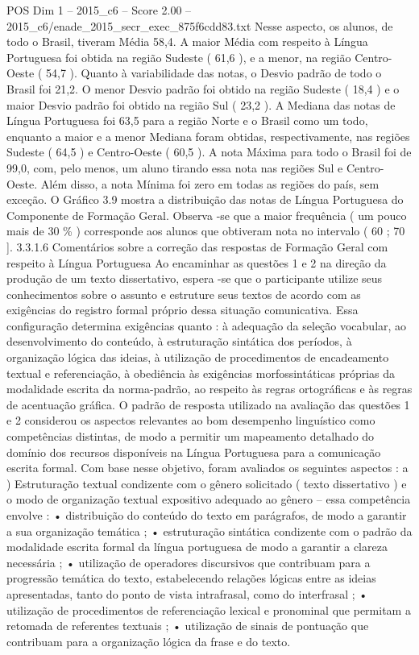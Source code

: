 \begin{textsample}{POS Dim 1 – 2015\_c6 – Score 2.00 – 2015\_c6/enade\_2015\_secr\_exec\_875f6cdd83.txt}
Nesse aspecto, os alunos, de todo o Brasil, tiveram Média 58,4.
A maior Média com respeito à Língua Portuguesa foi obtida na região Sudeste ( 61,6 ), e a menor, na região Centro-Oeste ( 54,7 ).
Quanto à variabilidade das notas, o Desvio padrão de todo o Brasil foi 21,2.
O menor Desvio padrão foi obtido na região Sudeste ( 18,4 ) e o maior Desvio padrão foi obtido na região Sul ( 23,2 ).
A Mediana das notas de Língua Portuguesa foi 63,5 para a região Norte e o Brasil como um todo, enquanto a maior e a menor Mediana foram obtidas, respectivamente, nas regiões Sudeste ( 64,5 ) e Centro-Oeste ( 60,5 ).
A nota Máxima para todo o Brasil foi de 99,0, com, pelo menos, um aluno tirando essa nota nas regiões Sul e Centro-Oeste.
Além disso, a nota Mínima foi zero em todas as regiões do país, sem exceção.
O Gráfico 3.9 mostra a distribuição das notas de Língua Portuguesa do Componente de Formação Geral.
Observa -se que a maior frequência ( um pouco mais de 30 \% ) corresponde aos alunos que obtiveram nota no intervalo ( 60 ; 70 ]. 3.3.1.6 Comentários sobre a correção das respostas de Formação Geral com respeito à Língua Portuguesa Ao encaminhar as questões 1 e 2 na direção da produção de um texto dissertativo, espera -se que o participante utilize seus conhecimentos sobre o assunto e estruture seus textos de acordo com as exigências do registro formal próprio dessa situação comunicativa.
Essa configuração determina exigências quanto : à adequação da seleção vocabular, ao desenvolvimento do conteúdo, à estruturação sintática dos períodos, à organização lógica das ideias, à utilização de procedimentos de encadeamento textual e referenciação, à obediência às exigências morfossintáticas próprias da modalidade escrita da norma-padrão, ao respeito às regras ortográficas e às regras de acentuação gráfica.
O padrão de resposta utilizado na avaliação das questões 1 e 2 considerou os aspectos relevantes ao bom desempenho linguístico como competências distintas, de modo a permitir um mapeamento detalhado do domínio dos recursos disponíveis na Língua Portuguesa para a comunicação escrita formal.
Com base nesse objetivo, foram avaliados os seguintes aspectos : a ) Estruturação textual condizente com o gênero solicitado ( texto dissertativo ) e o modo de organização textual expositivo adequado ao gênero – essa competência envolve : • distribuição do conteúdo do texto em parágrafos, de modo a garantir a sua organização temática ; • estruturação sintática condizente com o padrão da modalidade escrita formal da língua portuguesa de modo a garantir a clareza necessária ; • utilização de operadores discursivos que contribuam para a progressão temática do texto, estabelecendo relações lógicas entre as ideias apresentadas, tanto do ponto de vista intrafrasal, como do interfrasal ; • utilização de procedimentos de referenciação lexical e pronominal que permitam a retomada de referentes textuais ; • utilização de sinais de pontuação que contribuam para a organização lógica da frase e do texto.

\end{textsample}
